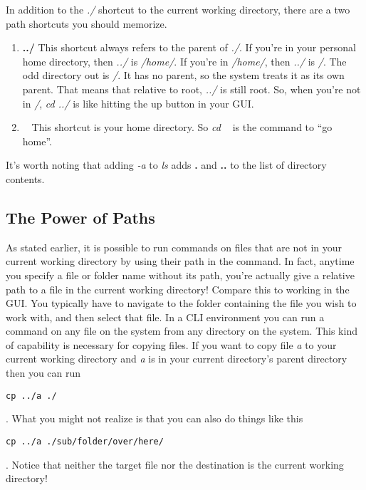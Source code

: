 \documentclass[]{tufte-handout}
\begin{document}
In addition to the \textit{./} shortcut to the current working directory, there are a two path shortcuts you should memorize.
\begin{enumerate}
\item \textbf{../}  \newline
This shortcut always refers to the parent of \textit{./}.  If you're in your personal home directory, then \textit{../} is \textit{/home/}. If you're in \textit{/home/}, then \textit{../} is \textit{/}. The odd directory out is \textit{/}. It has no parent, so the system treats it as its own parent.  That means that relative to root, \textit{../} is still root.  So, when you're not in \textit{/}, \textit{cd ../} is like hitting the up button in your GUI. 

\item \textbf{~} \newline
This shortcut is your home directory.  So \textit{cd ~} is the command to ``go home''.
\end{enumerate}

It's worth noting that adding \textit{-a} to \textit{ls} adds \textbf{.} and \textbf{..} to the list of directory contents.

\subsection{The Power of Paths}

As stated earlier, it is possible to run commands on files that are not in your current working directory by using their path in the command.  In fact, anytime you specify a file or folder name without its path, you're actually give a relative path to a file in the current working directory! Compare this to working in the GUI. You typically have to navigate to the folder containing the file you wish to work with, and then select that file. In a CLI environment you can run a command on any file on the system from any directory on the system.  This kind of capability is necessary for copying files.  If you want to copy file \textit{a} to your current working directory and \textit{a} is in your current directory's parent directory then you can run \begin{verbatim}cp ../a ./\end{verbatim}.  What you might not realize is that you can also do things like this \begin{verbatim}cp ../a ./sub/folder/over/here/ \end{verbatim}.  Notice that neither the target file nor the destination is the current working directory!  
\end{document}
